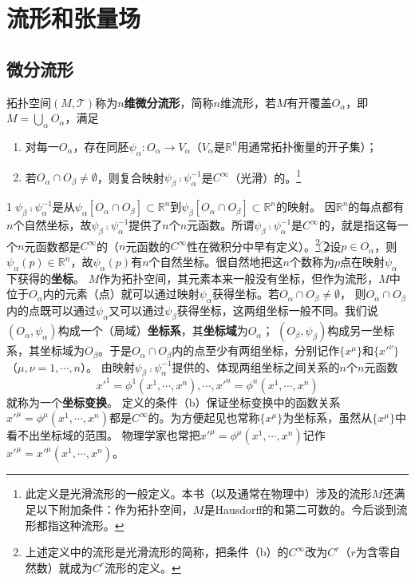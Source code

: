 \chapter{流形和张量场}

\section{微分流形}

\begin{definition}
拓扑空间$(M, \mathscr{T})$称为\textbf{$n$维微分流形}，简称$n$维流形，若$M$有开覆盖${O_\alpha}$，即$M = \bigcup\limits_\alpha O_\alpha$，满足
\begin{enumerate}[（a）]
\item 对每一$O_\alpha$，存在同胚$\psi_\alpha \colon O_\alpha \to V_\alpha$（$V_\alpha$是$\mathbb{R}^n$用通常拓扑衡量的开子集）；
\item 若$O_\alpha \cap O_\beta \neq \emptyset$，则复合映射$\psi_\beta \comp \psi_\alpha^{-1}$是$C^\infty$（光滑）的。\footnote{
此定义是光滑流形的一般定义。本书（以及通常在物理中）涉及的流形$M$还满足以下附加条件：作为拓扑空间，$M$是Hausdorff的和第二可数的。今后谈到流形都指这种流形。
}
\end{enumerate}
\end{definition}

\begin{note}
\textcircled{1}$\psi_\beta \comp \psi_\alpha^{-1}$是从$\psi_\alpha[O_\alpha \cap O_\beta] \subset \mathbb{R}^n$到$\psi_\beta[O_\alpha \cap O_\beta] \subset \mathbb{R}^n$的映射。
因$\mathbb{R}^n$的每点都有$n$个自然坐标，故$\psi_\beta \comp \psi_\alpha^{-1}$提供了$n$个$n$元函数。所谓$\psi_\beta \comp \psi_\alpha^{-1}$是$C^\infty$的，就是指这每一个$n$元函数都是$C^\infty$的（$n$元函数的$C^\infty$性在微积分中早有定义）。\footnote{
上述定义中的流形是光滑流形的简称，把条件（b）的$C^\infty$改为$C^r$（$r$为含零自然数）就成为$C^r$流形的定义。
}
\textcircled{2}设$p \in O_\alpha$，则$\psi_\alpha(p) \in \mathbb{R}^n$，故$\psi_\alpha(p)$有$n$个自然坐标。很自然地把这$n$个数称为$p$点在映射$\psi_\alpha$下获得的\textbf{坐标}。
$M$作为拓扑空间，其元素本来一般没有坐标，但作为流形，$M$中位于$O_\alpha$内的元素（点）就可以通过映射$\psi_\alpha$获得坐标。若$O_\alpha \cap O_\beta \neq \emptyset$，
则$O_\alpha \cap O_\beta$内的点既可以通过$\psi_\alpha$又可以通过$\psi_\beta$获得坐标，这两组坐标一般不同。我们说$(O_\alpha, \psi_\alpha)$构成一个（局域）\textbf{坐标系}，其\textbf{坐标域}为$O_\alpha$；
$(O_\beta, \psi_\beta)$构成另一坐标系，其坐标域为$O_\beta$。于是$O_\alpha \cap O_\beta$内的点至少有两组坐标，分别记作$\{x^\mu\}$和$\{x'^\nu\}$（$\mu, \nu = 1, \cdots, n$）。
由映射$\psi_\beta \comp \psi_\alpha^{-1}$提供的、体现两组坐标之间关系的$n$个$n$元函数$$x'^1 = \phi^1(x^1, \cdots, x^n), \cdots, x'^n = \phi^n(x^1, \cdots, x^n)$$就称为一个\textbf{坐标变换}。
定义的条件（b）保证坐标变换中的函数关系$x'^\mu = \phi^\mu(x^1, \cdots, x^n)$都是$C^\infty$的。为方便起见也常称$\{x^\mu\}$为坐标系，虽然从$\{x^\mu\}$中看不出坐标域的范围。
物理学家也常把$x'^\mu = \phi^\mu(x^1, \cdots, x^n)$记作$x'^\mu = x'^\mu(x^1, \cdots, x^n)$。
\end{note}

